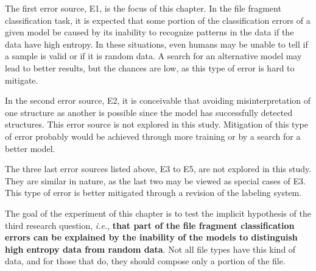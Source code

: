 The first error source, E1, is the focus of this chapter. In the file fragment classification task, it is expected that some portion of the classification errors of a given model be caused by its inability to recognize patterns in the data if the data have high entropy. In these situations, even humans may be unable to tell if a sample is valid or if it is random data. A search for an alternative model may lead to better results, but the chances are low, as this type of error is hard to mitigate. 

In the second error source, E2, it is conceivable that avoiding misinterpretation of one structure as another is possible since the model has successfully detected structures. This error source is not explored in this study. Mitigation of this type of error probably would be achieved through more training or by a search for a better model.

The three last error sources listed above, E3 to E5, are not explored in this study. They are similar in nature, as the last two may be viewed as special cases of E3. This type of error is better mitigated through a revision of the labeling system.


The goal of the experiment of this chapter is to test the implicit hypothesis of the third research question, \textit{i.e.}, \textbf{that part of the file fragment classification errors can be explained by the inability of the models to distinguish high entropy data from random data}. Not all file types have this kind of data, and for those that do, they should compose only a portion of the file.


